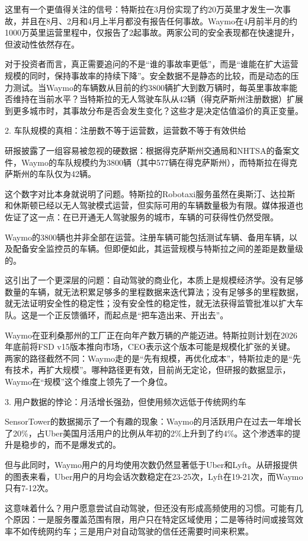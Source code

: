 \documentclass[11pt]{ctexart}
\begin{document}
这里有一个更值得关注的信号：特斯拉在3月份实现了约20万英里才发生一次事故，并且在8月、2月和4月上半月都没有报告任何事故。Waymo在4月前半月的约1000万英里运营里程中，仅报告了2起事故。两家公司的安全表现都在快速提升，但波动性依然存在。

对于投资者而言，真正需要追问的不是“谁的事故率更低”，而是“谁能在扩大运营规模的同时，保持事故率的持续下降”。安全数据不是静态的比较，而是动态的压力测试。当Waymo的车辆数从目前的约3800辆扩大到数万辆时，每英里事故率能否维持在当前水平？当特斯拉的无人驾驶车队从42辆（得克萨斯州注册数据）扩展到更多城市时，其事故分布是否会发生变化？这些才是决定估值溢价的真正变量。

2. 车队规模的真相：注册数不等于运营数，运营数不等于有效供给

研报披露了一组容易被忽视的硬数据：根据得克萨斯州交通局和NHTSA的备案文件，Waymo的车队规模约为3800辆（其中577辆在得克萨斯州），而特斯拉在得克萨斯州的车队仅为42辆。

这个数字对比本身就说明了问题。特斯拉的Robotaxi服务虽然在奥斯汀、达拉斯和休斯顿已经以无人驾驶模式运营，但实际可用的车辆数量极为有限。媒体报道也佐证了这一点：在已开通无人驾驶服务的城市，车辆的可获得性仍然受限。

Waymo的3800辆也并非全部在运营。注册车辆可能包括测试车辆、备用车辆，以及配备安全监控员的车辆。但即便如此，其运营规模与特斯拉之间的差距是数量级的。

这引出了一个更深层的问题：自动驾驶的商业化，本质上是规模经济学。没有足够数量的车辆，就无法积累足够多的里程数据来迭代算法；没有足够多的里程数据，就无法证明安全性的稳定性；没有安全性的稳定性，就无法获得监管批准以扩大车队。这是一个正反馈循环，而起点是“把车造出来、开出去”。

Waymo在亚利桑那州的工厂正在向年产数万辆的产能迈进。特斯拉则计划在2026年底前将FSD v15版本推向市场，CEO表示这个版本可能是规模化扩张的关键。两家的路径截然不同：Waymo走的是“先有规模，再优化成本”，特斯拉走的是“先有技术，再扩大规模”。哪种路径更有效，目前尚无定论，但研报的数据显示，Waymo在“规模”这个维度上领先了一个身位。

3. 用户数据的悖论：月活增长强劲，但使用频次远低于传统网约车

SensorTower的数据揭示了一个有趣的现象：Waymo的月活跃用户在过去一年增长了20\%，占Uber美国月活用户的比例从年初的2\%上升到了约4\%。这个渗透率的提升是稳步的，而不是爆发式的。

但与此同时，Waymo用户的月均使用次数仍然显著低于Uber和Lyft。从研报提供的图表来看，Uber用户的月均会话次数稳定在23-25次，Lyft在19-21次，而Waymo只有7-12次。

这意味着什么？用户愿意尝试自动驾驶，但还没有形成高频使用的习惯。可能有几个原因：一是服务覆盖范围有限，用户只在特定区域使用；二是等待时间或接驾效率不如传统网约车；三是用户对自动驾驶的信任还需要时间来积累。
\end{document}
